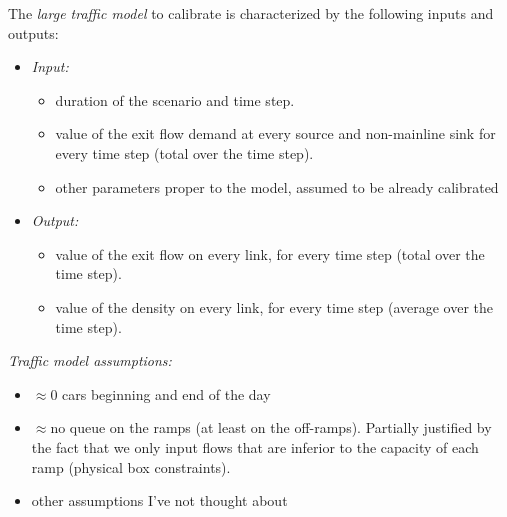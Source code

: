 The \emph{large traffic model} to calibrate is characterized by the following inputs and outputs:
\begin{itemize}
	\item \emph{Input:} 
	\begin{itemize}
		\item   duration of the scenario and time step.
		\item   value of the exit flow demand at every source and non-mainline sink for every time step (total over the time step).
		\item	other parameters proper to the model, assumed to be already calibrated
	\end{itemize}
	\item \emph{Output:}
	\begin{itemize}
		\item   value of the exit flow on every link, for every time step (total over the time step).
		\item	value of the density on every link, for every time step (average over the time step).		
	\end{itemize}
\end{itemize}
\emph{Traffic model assumptions:}
\begin{itemize}
	\item $\approx 0$ cars beginning and end of the day
	\item $\approx$no queue on the ramps (at least on the off-ramps). Partially justified by the fact that we only input flows that are inferior to the capacity of each ramp (physical box constraints).
	\item other assumptions I've not thought about
\end{itemize}
